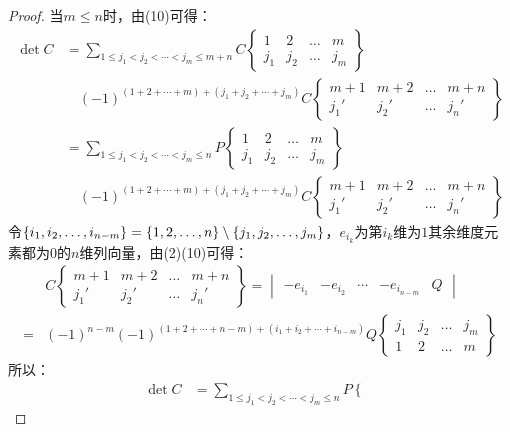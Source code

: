\begin{proof}
	当$m\leqslant n$时，由(10)可得：
	\begin{align*}
		\det C&=\sum_{1\leqslant j_1<j_2<\cdots<j_m\leqslant m+n}C\left\{ \begin{array}{*{4}{c}}
			1 & 2 & \dots & m \\
			j_1 & j_2 & \dots & j_m
		\end{array}\right\} \\
		&\quad(-1)^{(1+2+\cdots+m)+(j_1+j_2+\cdots+j_m)}C\left\{
		\begin{array}{*{4}{c}}
			m+1 & m+2 & \dots & m+n \\
			j_1' & j_2' & \dots & j_{n}'
		\end{array}\right\} \\
		&=\sum_{1\leqslant j_1<j_2<\cdots<j_m\leqslant n}P\left\{
		\begin{array}{*{4}{c}}
			1 & 2 & \dots & m \\
			j_1 & j_2 & \dots & j_m
		\end{array}\right\} \\
		&\quad(-1)^{(1+2+\cdots+m)+(j_1+j_2+\cdots+j_m)}C\left\{
		\begin{array}{*{4}{c}}
			m+1 & m+2 & \dots & m+n \\
			j_1' & j_2' & \dots & j_{n}'
		\end{array}\right\}
	\end{align*}
	令$\{i_1, i_2, \dots, i_{n-m}\}=\{1,2,\dots,n\}\setminus\{	j_1,j_2,\dots,j_m\}$，$e_{i_k}$为第$i_k$维为$1$其余维度元素都为$0$的$n$维列向量，由(2)(10)可得：
	\begin{align*}
		&C\left\{
		\begin{array}{*{4}{c}}
			m+1 & m+2 & \dots & m+n \\
			j_1' & j_2' & \dots & j_{n}'
		\end{array}\right\}=
		\begin{vmatrix}
			-e_{i_1} & -e_{i_2} & \cdots & -e_{i_{n-m}} & Q
		\end{vmatrix} \\
		=&(-1)^{n-m}(-1)^{(1+2+\cdots+n-m)+(i_1+i_2+\cdots+i_{n-m})}Q\left\{ \begin{array}{*{4}{c}}
			j_1 & j_2 & \dots & j_m \\
			1   & 2   & \dots & m
		\end{array}\right\}
	\end{align*}
	所以：
	\begin{align*}
		\det C&=\sum_{1\leqslant j_1<j_2<\cdots<j_m\leqslant n}P\left\{ \begin{array}{*{4}{c}}

\end{array}
\end{align*}
\end{proof}
